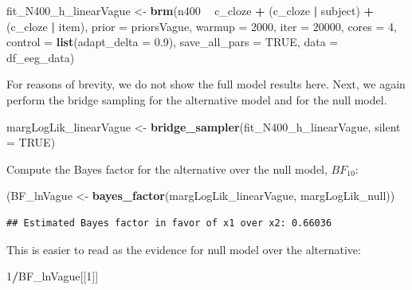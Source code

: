 \documentclass[12pt,]{krantz}
\newenvironment{Shaded}{\begin{snugshade}}{\end{snugshade}}
\newcommand{\KeywordTok}[1]{\textcolor[rgb]{0.13,0.29,0.53}{\textbf{#1}}}
\newcommand{\DataTypeTok}[1]{\textcolor[rgb]{0.13,0.29,0.53}{#1}}
\newcommand{\DecValTok}[1]{\textcolor[rgb]{0.00,0.00,0.81}{#1}}
\newcommand{\FloatTok}[1]{\textcolor[rgb]{0.00,0.00,0.81}{#1}}
\newcommand{\StringTok}[1]{\textcolor[rgb]{0.31,0.60,0.02}{#1}}
\newcommand{\OtherTok}[1]{\textcolor[rgb]{0.56,0.35,0.01}{#1}}
\newcommand{\OperatorTok}[1]{\textcolor[rgb]{0.81,0.36,0.00}{\textbf{#1}}}
\newcommand{\NormalTok}[1]{#1}
\theoremstyle{definition}
\theoremstyle{definition}
\theoremstyle{definition}
\theoremstyle{remark}
\begin{document}
\begin{Shaded}
\begin{Highlighting}[]
\NormalTok{fit_N400_h_linearVague <-}\StringTok{ }\KeywordTok{brm}\NormalTok{(n400 }\OperatorTok{~}\StringTok{ }\NormalTok{c_cloze }\OperatorTok{+}\StringTok{ }
\StringTok{        }\NormalTok{(c_cloze }\OperatorTok{|}\StringTok{ }\NormalTok{subject) }\OperatorTok{+}\StringTok{ }\NormalTok{(c_cloze }\OperatorTok{|}\StringTok{ }\NormalTok{item), }
        \DataTypeTok{prior   =}\NormalTok{ priorsVague,}
        \DataTypeTok{warmup  =} \DecValTok{2000}\NormalTok{,}
        \DataTypeTok{iter    =} \DecValTok{20000}\NormalTok{,}
        \DataTypeTok{cores   =} \DecValTok{4}\NormalTok{,}
        \DataTypeTok{control =} \KeywordTok{list}\NormalTok{(}\DataTypeTok{adapt_delta =} \FloatTok{0.9}\NormalTok{),}
        \DataTypeTok{save_all_pars =} \OtherTok{TRUE}\NormalTok{,}
        \DataTypeTok{data    =}\NormalTok{ df_eeg_data)}
\end{Highlighting}
\end{Shaded}

For reasons of brevity, we do not show the full model results here.
Next, we again perform the bridge sampling for the alternative model and
for the null model.

\begin{Shaded}
\begin{Highlighting}[]
\NormalTok{margLogLik_linearVague <-}\StringTok{ }\KeywordTok{bridge_sampler}\NormalTok{(fit_N400_h_linearVague, }\DataTypeTok{silent =} \OtherTok{TRUE}\NormalTok{)}
\end{Highlighting}
\end{Shaded}

Compute the Bayes factor for the alternative over the null model,
\(BF_{10}\):

\begin{Shaded}
\begin{Highlighting}[]
\NormalTok{(BF_lnVague <-}\StringTok{ }\KeywordTok{bayes_factor}\NormalTok{(margLogLik_linearVague, margLogLik_null)) }
\end{Highlighting}
\end{Shaded}

\begin{verbatim}
## Estimated Bayes factor in favor of x1 over x2: 0.66036
\end{verbatim}

This is easier to read as the evidence for null model over the
alternative:

\begin{Shaded}
\begin{Highlighting}[]
\DecValTok{1}\OperatorTok{/}\NormalTok{BF_lnVague[[}\DecValTok{1}\NormalTok{]] }
\end{Highlighting}
\end{Shaded}
\end{document}

